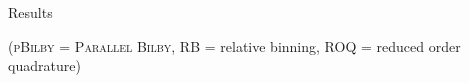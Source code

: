 \documentclass[usenames,dvipsnames,t]{beamer}
\begin{document}
\begin{frame}{Results}
{\normalsize

\vspace{\y}

\scriptsize{(\textsc{pBilby} = \textsc{Parallel Bilby}, RB = relative binning, ROQ = reduced order quadrature)}
}
\end{frame}



        

  
        


\end{document}
